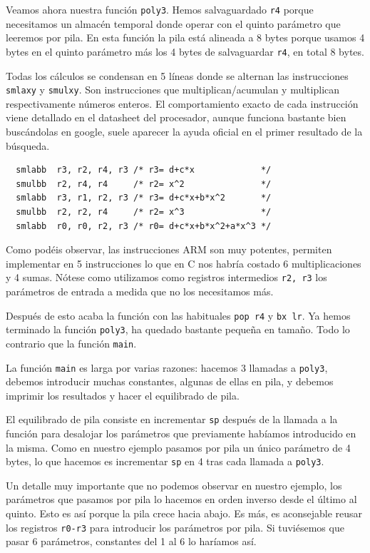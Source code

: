 Veamos ahora nuestra función {\tt poly3}. Hemos salvaguardado {\tt r4} porque
necesitamos un almacén temporal donde operar con el quinto parámetro que
leeremos por pila. En esta función la pila está alineada a 8 bytes porque
usamos 4 bytes en el quinto parámetro más los 4 bytes de salvaguardar {\tt r4},
en total 8 bytes.

Todas los cálculos se condensan en 5 líneas donde se alternan las instrucciones
{\tt smlaxy} y {\tt smulxy}. Son instrucciones que multiplican/acumulan y
multiplican respectivamente números enteros. El comportamiento exacto de cada
instrucción viene detallado en el datasheet del procesador, aunque funciona
bastante bien buscándolas en google, suele aparecer la ayuda oficial en el primer
resultado de la búsqueda.

\begin{lstlisting}
  smlabb  r3, r2, r4, r3 /* r3= d+c*x             */
  smulbb  r2, r4, r4     /* r2= x^2               */
  smlabb  r3, r1, r2, r3 /* r3= d+c*x+b*x^2       */
  smulbb  r2, r2, r4     /* r2= x^3               */
  smlabb  r0, r0, r2, r3 /* r0= d+c*x+b*x^2+a*x^3 */
\end{lstlisting}

Como podéis observar, las instrucciones ARM son muy potentes, permiten
implementar en 5 instrucciones lo que en C nos habría costado 6
multiplicaciones y 4 sumas. Nótese como utilizamos como registros
intermedios {\tt r2, r3} los parámetros de entrada a medida que no los
necesitamos más.

Después de esto acaba la función con las habituales {\tt pop {r4}} y
{\tt bx lr}. Ya hemos terminado la función {\tt poly3}, ha quedado
bastante pequeña en tamaño. Todo lo contrario que la función {\tt main}.

La función {\tt main} es larga por varias razones: hacemos 3 llamadas
a {\tt poly3}, debemos introducir muchas constantes, algunas de ellas
en pila, y debemos imprimir los resultados y hacer el equilibrado de pila.

El equilibrado de pila consiste en incrementar {\tt sp} después de la
llamada a la función para desalojar los parámetros que previamente habíamos
introducido en la misma. Como en nuestro ejemplo pasamos por pila un
único parámetro de 4 bytes, lo que hacemos es incrementar {\tt sp} en 4 tras
cada llamada a {\tt poly3}.

Un detalle muy importante que no podemos observar en nuestro ejemplo, los
parámetros que pasamos por pila lo hacemos en orden inverso desde el último
al quinto. Esto es así porque la pila crece hacia abajo. Es más, es
aconsejable reusar los registros {\tt r0-r3} para introducir los
parámetros por pila. Si tuviésemos que pasar 6 parámetros, constantes del
1 al 6 lo haríamos así.

